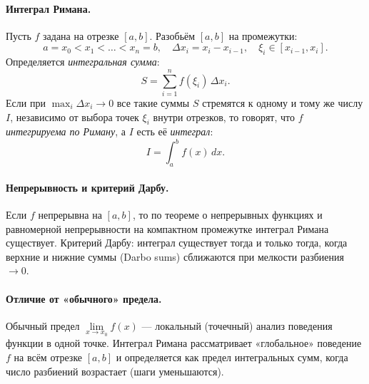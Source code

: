 
\paragraph{Интеграл Римана.}
Пусть $f$ задана на отрезке $[a,b]$.
Разобьём $[a,b]$ на промежутки:
\[
	a = x_0 < x_1 < \dots < x_n = b,
	\quad \Delta x_i = x_i - x_{i-1},
	\quad \xi_i \in [x_{i-1}, x_i].
\]
Определяется \emph{интегральная сумма}:
\[
	S = \sum_{i=1}^n f(\xi_i)\,\Delta x_i.
\]
Если при $\max_i \Delta x_i \to 0$ все такие суммы $S$ стремятся к одному и тому же числу $I$, независимо от выбора точек $\xi_i$ внутри отрезков, то говорят, что $f$ \emph{интегрируема по Риману}, а $I$ есть её \emph{интеграл}:
\[
	I = \int_a^b f(x)\,dx.
\]

\bigskip

\paragraph{Непрерывность и критерий Дарбу.}
Если $f$ непрерывна на $[a,b]$, то по теореме о непрерывных функциях и равномерной непрерывности на компактном промежутке интеграл Римана существует.
Критерий Дарбу: интеграл существует тогда и только тогда, когда верхние и нижние суммы (Darbo sums) сближаются при мелкости разбиения $\to 0$.

\bigskip

\paragraph{Отличие от «обычного» предела.}
Обычный предел \(\lim\limits_{x\to x_0} f(x)\) — локальный (точечный) анализ поведения функции в одной точке.
Интеграл Римана рассматривает «глобальное» поведение $f$ на всём отрезке $[a,b]$ и определяется как предел интегральных сумм, когда число разбиений возрастает (шаги уменьшаются).
